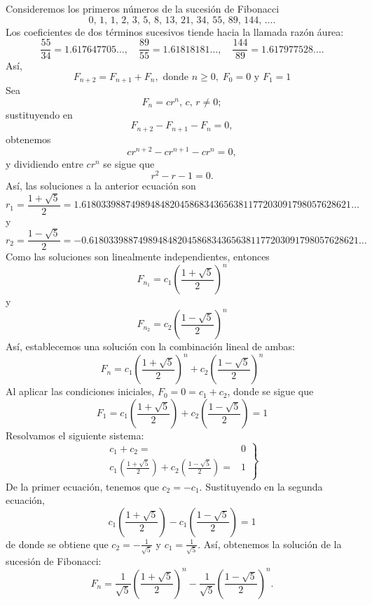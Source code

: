 \begin{myexample}
    Consideremos los primeros números de la sucesión de Fibonacci
    $$0, \, 1, \, 1, \, 2, \, 3, \, 5, \, 8, \, 13, \, 21, \, 34, \, 55, \, 89, \, 144, \, \dots.$$
    Los coeficientes de dos términos sucesivos tiende hacia la llamada razón áurea:
    $$\frac{55}{34} = 1.617647705 \dots, \quad \frac{89}{55} = 1.61818181\dots, \quad \frac{144}{89} = 1.617977528\dots.$$
    Así,
    $$F_{n+2} = F_{n+1} + F_n, \text{ donde } n \geq 0, \; F_0 = 0 \text{ y } F_1 = 1$$
    Sea
    $$F_n = cr^{n}, \, c, \, r \neq 0;$$
    sustituyendo en
    $$F_{n+2} - F_{n+1} - F_n = 0,$$
    obtenemos
    $$cr^{n+2} - cr^{n+1} - cr^{n} = 0,$$
    y dividiendo entre $cr^{n}$ se sigue que
    $$r^{2} - r -1 = 0.$$
    Así, las soluciones a la anterior ecuación son
    $$r_1 = \frac{1 + \sqrt{5}}{2} = 1.6180339887498948482045868343656381177203091798057628621 \dots$$
    y
    $$r_2 = \frac{1 - \sqrt{5}}{2} = - 0.6180339887498948482045868343656381177203091798057628621 \dots$$
    Como las soluciones son linealmente independientes, entonces
    $$F_{n_1} = c_1 \left( \frac{1 + \sqrt{5}}{2} \right)^{n}$$
    y
    $$F_{n_2} = c_2 \left( \frac{1 - \sqrt{5}}{2} \right)^{n}$$
    Así, establecemos una solución con la combinación lineal de ambas:
    $$F_n = c_1 \left( \frac{1 + \sqrt{5}}{2} \right)^{n} + c_2 \left( \frac{1 - \sqrt{5}}{2} \right)^{n}$$
    Al aplicar las condiciones iniciales, $F_0 = 0 = c_1 + c_2$, donde se sigue que
    $$F_1 = c_1 \left( \frac{1 + \sqrt{5}}{2} \right) + c_2 \left( \frac{1 - \sqrt{5}}{2} \right) = 1$$
    Resolvamos el siguiente sistema:
    $$\left.\begin{array}{rl}
        c_1 + c_2 = & \!\!\!\! 0 \\
        \displaystyle c_1 \left( \frac{1 + \sqrt{5}}{2} \right) + c_2 \left( \frac{1 - \sqrt{5}}{2} \right) = & \!\!\!\! 1
    \end{array}\right\}$$
    De la primer ecuación, tenemos que $c_2 = -c_1$. Sustituyendo en la segunda ecuación,
    $$c_1 \left( \frac{1 + \sqrt{5}}{2} \right) - c_1 \left( \frac{1 - \sqrt{5}}{2} \right) = 1$$
    de donde se obtiene que $\displaystyle c_2 = - \frac{1}{\sqrt{5}}$ y $\displaystyle c_1 = \frac{1}{\sqrt{5}}$. Así, obtenemos la solución de la sucesión de Fibonacci:
    $$F_n = \frac{1}{\sqrt{5}} \left( \frac{1 + \sqrt{5}}{2} \right)^{n} - \frac{1}{\sqrt{5}} \left( \frac{1 - \sqrt{5}}{2} \right)^{n}.$$
\end{myexample}

\newpage

